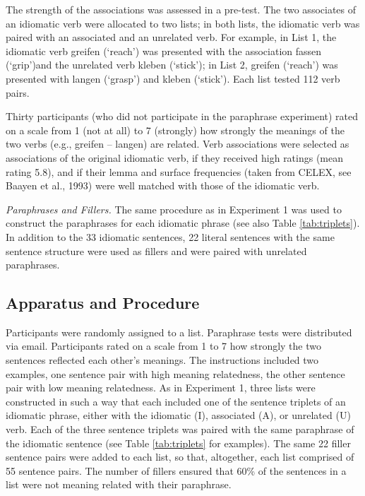 \documentclass[output=paper]{langsci/langscibook}
\begin{document}
The strength of the associations was assessed in a pre-test. The two associates of an idiomatic verb were allocated to two lists; in both lists, the idiomatic verb was paired with an associated and an unrelated verb.  For example, in List 1, the idiomatic verb greifen (‘reach’) was presented with the association fassen (‘grip’)and the unrelated verb kleben (‘stick’); in List 2, greifen (‘reach’) was presented with langen (‘grasp’) and kleben (‘stick’). Each list tested 112 verb pairs. 

Thirty participants (who did not participate in the paraphrase experiment) rated on a scale from 1 (not at all) to 7 (strongly) how strongly the meanings of the two verbs (e.g., greifen – langen) are related. Verb associations were selected as associations of the original idiomatic verb, if they received high ratings (mean rating 5.8), and if their lemma and surface frequencies (taken from CELEX, see Baayen et al., 1993) were well matched with those of the idiomatic verb. 

\textit{Paraphrases and Fillers.} The same procedure as in Experiment 1 was used to construct the paraphrases for each idiomatic phrase (see also Table \ref{tab:triplets}). In addition to the 33 idiomatic sentences, 22 literal sentences with the same sentence structure were used as fillers and were paired with unrelated paraphrases. 

\subsection{Apparatus and Procedure}

Participants were randomly assigned to a list. Paraphrase tests were distributed via email. Participants rated on a scale from 1 to 7 how strongly the two sentences reflected each other’s meanings. The instructions included two examples, one sentence pair with high meaning relatedness, the other sentence pair with low meaning relatedness. 
As in Experiment 1, three lists were constructed in such a way that each included one of the sentence triplets of an idiomatic phrase, either with the idiomatic (I), associated (A), or unrelated (U) verb. Each of the three sentence triplets was paired with the same paraphrase of the idiomatic sentence (see Table \ref{tab:triplets} for examples). The same 22 filler sentence pairs were added to each list, so that, altogether, each list comprised of 55 sentence pairs. The number of fillers ensured that 60\% of the sentences in a list were not meaning related with their paraphrase. 
\end{document}
